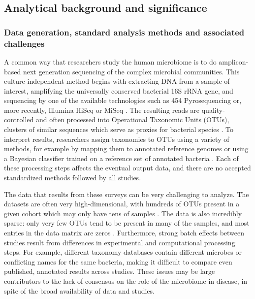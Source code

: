 \documentclass[12pt]{article}
\begin{document}
\subsection{Analytical background and significance}

\subsubsection{Data generation, standard analysis methods and associated challenges} 
A common way that researchers study the human microbiome is to do 
amplicon-based next generation sequencing of the complex microbial 
communities. This culture-independent method begins with extracting
DNA from a sample of interest, amplifying the universally conserved
bacterial 16S rRNA gene, and sequencing by one of the available technologies such as 454 
Pyrosequencing or, more recently, Illumina HiSeq or MiSeq \cite{knights-supervised-2010, sze-signal-2016}. 
The resulting reads are quality-controlled and often processed into Operational Taxonomic Units (OTUs), 
clusters of similar sequences which serve as proxies for bacterial 
species \cite{knights-supervised-2010}. To interpret results, researchers assign taxonomies to 
OTUs using a variety of methods, for example by mapping them to 
annotated reference genomes or using a Bayesian classifier trained on 
a reference set of annotated bacteria \cite{wang-rdp-2007, mcdonald-gg-2011}. Each of 
these processing steps affects the eventual output data, and there
are no accepted standardized methods followed by all studies.

The data that results from these surveys can be very challenging to analyze.
The datasets are often very high-dimensional, with hundreds 
of OTUs present in a given cohort which may only have tens of samples \cite{sze-signal-2016}. 
The data is also incredibly sparse: only very few OTUs tend to be 
present in many of the samples, and most entries in the data matrix 
are zeros \cite{knights-biomarkers-2011}. 
Furthermore, strong batch effects between studies result from 
differences in experimental and computational processing steps.
For example, different taxonomy databases contain different 
microbes or conflicting names for the same bacteria, making it 
difficult to compare even published, annotated results across studies.  
These issues may be large contributors to the lack of consensus on the 
role of the microbiome in disease, in spite of the broad availability of data and studies.
\end{document}
